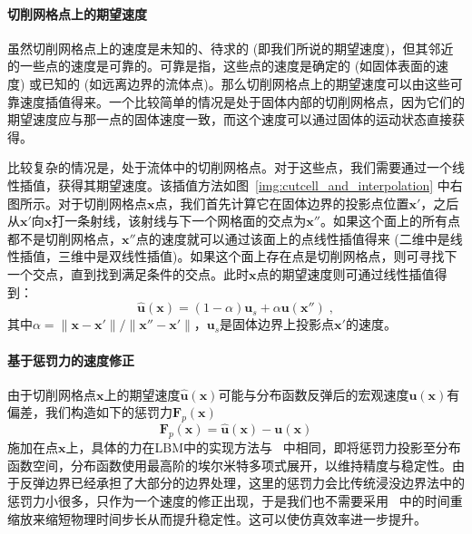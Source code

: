 \paragraph{切削网格点上的期望速度}
虽然切削网格点上的速度是未知的、待求的 (即我们所说的期望速度)，但其邻近的一些点的速度是可靠的。可靠是指，这些点的速度是确定的 (如固体表面的速度) 或已知的 (如远离边界的流体点)。那么切削网格点上的期望速度可以由这些可靠速度插值得来。一个比较简单的情况是处于固体内部的切削网格点，因为它们的期望速度应与那一点的固体速度一致，而这个速度可以通过固体的运动状态直接获得。

比较复杂的情况是，处于流体中的切削网格点。对于这些点，我们需要通过一个线性插值，获得其期望速度。该插值方法如图~\ref{img:cutcell_and_interpolation} 中右图所示。对于切削网格点$\bm{x}$点，我们首先计算它在固体边界的投影点位置$\bm{x}'$，之后从$\bm{x}'$向$\bm{x}$打一条射线，该射线与下一个网格面的交点为$\bm{x}''$。如果这个面上的所有点都不是切削网格点，$\bm{x}''$点的速度就可以通过该面上的点线性插值得来 (二维中是线性插值，三维中是双线性插值)。如果这个面上存在点是切削网格点，则可寻找下一个交点，直到找到满足条件的交点。此时$\bm{x}$点的期望速度则可通过线性插值得到：
\begin{equation}  \label{eq:vel_lerp}
\hat{\bm{u}}(\bm{x})=(1-\alpha)\bm{u}_s + \alpha \bm{u}(\bm{x}'')\;,
\end{equation}
其中$\alpha=\|\bm{x}-\bm{x}'\|/\|\bm{x}''-\bm{x}'\|$，$\bm{u}_s$是固体边界上投影点$\bm{x}'$的速度。

\paragraph{基于惩罚力的速度修正}
由于切削网格点$\bm{x}$上的期望速度$\hat{\bm{u}}(\bm{x})$可能与分布函数反弹后的宏观速度$\bm{u}(\bm{x})$有偏差，我们构造如下的惩罚力$\bm{F}_p(\bm{x})$
\begin{equation} \label{eq:penaltyForce}
\bm{F}_p(\bm{x}) = \hat{\bm{u}}(\bm{x})-\bm{u}(\bm{x})
\end{equation}
施加在点$\bm{x}$上，具体的力在LBM中的实现方法与~\citep{Li-2020} 中相同，即将惩罚力投影至分布函数空间，分布函数使用最高阶的埃尔米特多项式展开，以维持精度与稳定性。由于反弹边界已经承担了大部分的边界处理，这里的惩罚力会比传统浸没边界法中的惩罚力小很多，只作为一个速度的修正出现，于是我们也不需要采用~\citep{Li-2020} 中的时间重缩放来缩短物理时间步长从而提升稳定性。这可以使仿真效率进一步提升。

